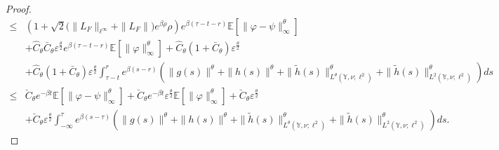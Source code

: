 \documentclass[11pt]{article}
\numberwithin{equation}{section}
\theoremstyle{plain}
\begin{document}
\begin{proof}
\begin{align}
  \le & \left( 1 + \sqrt{2}
 	                            \big( \|L_{F}\|_{\ell^\infty} + \|L_{F}\| \big)  e^{\beta \rho} \rho
 	       \right) e^{\beta (\tau-t-r) }
                            \mathbb{E}
                                   \left[ \| \varphi - \psi \|_\infty^\theta
                                   \right]  \nonumber\\
        & + \widehat{C}_\theta \bar{C}_\theta \varepsilon^{\frac{\theta}{2} }   
                e^{\beta (\tau-t-r)}
          	            \mathbb{E} \left[ \|\varphi\|_{\infty}^{\theta} \right] 
           + \widehat{C}_\theta (1 + \bar{C}_\theta) \varepsilon^{\frac{\theta}{2} }          
          	         \nonumber\\
       & +  \widehat{C}_\theta  (1 + \bar{C}_\theta) \varepsilon^{\frac{\theta}{2} } 
               	     \int_{\tau-t}^{r} e^{\beta (s-r)}
          	             \left( \|g(s)\|^{\theta} 
          	                      + \|h(s)\|^{\theta} 
          	                      + \| \widetilde{h}(s)\|_{L^{\theta}(\mathbb{Y},\nu; \ell^2)}^\theta
          	                        + \| \widetilde{h}(s)\|_{L^{2}(\mathbb{Y},\nu; \ell^2)}^\theta
          	             \right) ds \nonumber\\
  \le & \breve{C}_\theta e^{- \beta t}
                            \mathbb{E}
                                   \left[ \| \varphi - \psi \|_\infty^\theta
                                   \right]  
            + \breve{C}_\theta e^{- \beta t} \varepsilon^{\frac{\theta}{2} }   
                   \mathbb{E} \left[ \|\varphi\|_{\infty}^{\theta} \right] 
            + \breve{C}_\theta \varepsilon^{\frac{\theta}{2} }          
          	         \nonumber\\
        & + \breve{C}_\theta \varepsilon^{\frac{\theta}{2} } 
               	     \int_{-\infty}^{\tau} e^{\beta (s-\tau)}
          	             \left( \|g(s)\|^{\theta} 
          	                      + \|h(s)\|^{\theta} 
          	                      + \| \widetilde{h}(s)\|_{L^{\theta}(\mathbb{Y},\nu; \ell^2)}^\theta
          	                        + \| \widetilde{h}(s)\|_{L^{2}(\mathbb{Y},\nu; \ell^2)}^\theta
          	             \right) ds.                
 \end{align}


\end{proof}
\end{document}
